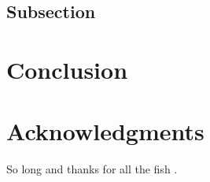 \documentclass[fleqn,10pt]{SelfArx} %
\begin{document}
\lipsum[14] %

\subsection{Subsection}

\lipsum[15-23] %


\section{Conclusion}

\lipsum[10] %

\section*{Acknowledgments} %


So long and thanks for all the fish \cite{Figueredo:2009dg}.




\end{document}
